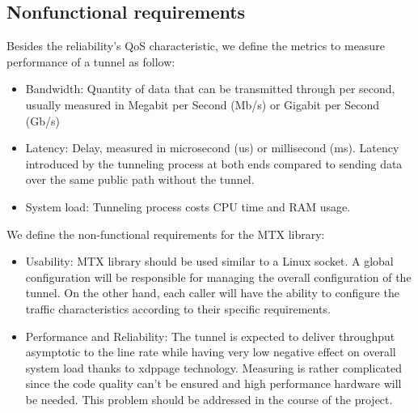 \subsection{Nonfunctional requirements}
Besides the reliability's \ac{QoS} characteristic, we define the metrics to measure performance of a tunnel as follow:
\begin{itemize}
    \item Bandwidth: Quantity of data that can be transmitted through per second, usually measured in Megabit per Second (Mb/s) or Gigabit  per Second (Gb/s)
    \item Latency: Delay, measured in microsecond (us) or millisecond (ms). Latency introduced by the tunneling process at both ends compared to sending data over the same public path without the tunnel.
    \item System load: Tunneling process costs CPU time and RAM usage.
\end{itemize}

We define the non-functional requirements for the \ac{MTX} library:
\begin{itemize}
    \item Usability: \ac{MTX} library should be used similar to a Linux socket. A global configuration will be responsible for managing the overall configuration of the tunnel. On the other hand, each caller will have the ability to configure the traffic characteristics according to their specific requirements.
    \item Performance and Reliability: The tunnel is expected to deliver throughput asymptotic to the line rate while having very low negative effect on overall system load thanks to \ac{xdppage} technology. Measuring is rather complicated since the code quality can't be ensured and high performance hardware will be needed. This problem should be addressed in the course of the project.
\end{itemize}

